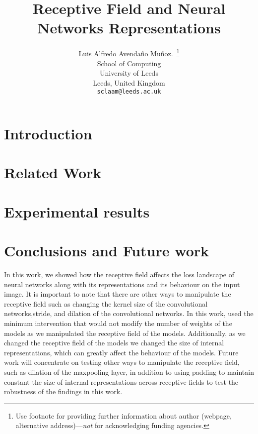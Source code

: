 \documentclass{article}
\title{Receptive Field and Neural Networks Representations}
\author{%
  Luis Alfredo Avendaño Muñoz.~\thanks{Use footnote for providing further information
    about author (webpage, alternative address)---\emph{not} for acknowledging
    funding agencies.} \\
  School of Computing\\
  University of Leeds\\
  Leeds, United Kingdom \\
  \texttt{sclaam@leeds.ac.uk} \\
}
\begin{document}
\maketitle


\begin{abstract}
\end{abstract}

\section{Introduction}

\section{Related Work}

\section{Experimental results}

\section{Conclusions and Future work}
\label{sec:conclusion}



 In this work, we showed how the receptive field affects the loss landscape of neural networks along with its representations and its behaviour on the input image.
It is important to note that there are other ways to manipulate the receptive field such as changing the kernel size of the
convolutional networks,stride, and dilation of the convolutional networks. In this work, used the minimum
intervention that would not modify the number of weights of the models as we manipulated the receptive field of the
models. Additionally, as we changed the receptive field of the models we changed the  size of internal representations,
which can greatly affect the behaviour of the models. Future work will concentrate on testing other ways to manipulate
the receptive field, such as dilation of the maxpooling layer, in addition to using padding to maintain constant the
size
of internal representations across receptive fields to test the robustness of the findings in this work.



  
\end{document}

